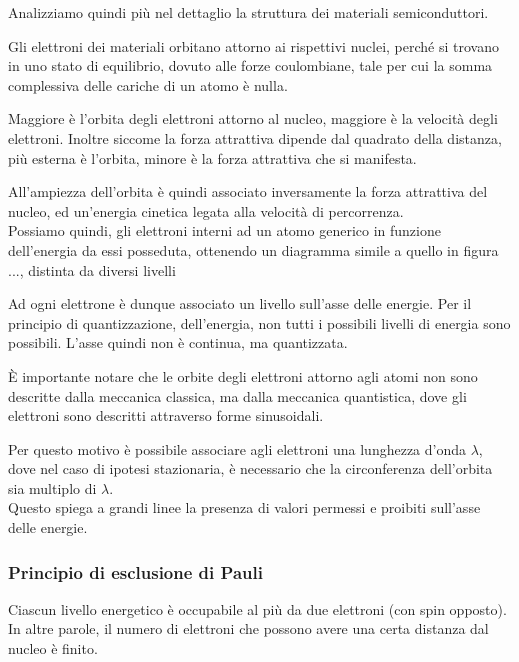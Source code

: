 \documentclass[../template]{subfiles}
\begin{document}
Analizziamo quindi più nel dettaglio la struttura dei materiali semiconduttori.

Gli elettroni dei materiali orbitano attorno ai rispettivi nuclei, perché si trovano in uno stato di equilibrio, dovuto alle forze coulombiane, tale per cui la somma complessiva delle cariche di un atomo è nulla.

Maggiore è l'orbita degli elettroni attorno al nucleo, maggiore è la velocità degli elettroni. Inoltre siccome la forza attrattiva dipende dal quadrato della distanza, più esterna è l'orbita, minore è la forza attrattiva che si manifesta.

All'ampiezza dell'orbita è quindi associato inversamente la forza attrattiva del nucleo, ed un'energia cinetica legata alla velocità di percorrenza.
\\
Possiamo quindi, gli elettroni interni ad un atomo generico in funzione dell'energia da essi posseduta, ottenendo un diagramma simile a quello in figura ..., distinta da diversi livelli

\begin{figure}[h]
    \centering
\end{figure}

Ad ogni elettrone è dunque associato un livello sull'asse delle energie.
Per il principio di quantizzazione, dell'energia, non tutti i possibili livelli di energia sono possibili. L'asse quindi non è continua, ma quantizzata.

È importante notare che le orbite degli elettroni attorno agli atomi non sono descritte dalla meccanica classica, ma dalla meccanica quantistica, dove gli elettroni sono descritti attraverso forme sinusoidali.

Per questo motivo è possibile associare agli elettroni una lunghezza d'onda $\lambda$, dove nel caso di ipotesi stazionaria, è necessario che la circonferenza dell'orbita sia multiplo di $\lambda$.
\\
Questo spiega a grandi linee la presenza di valori permessi e proibiti sull'asse delle energie.

\subsubsection{Principio di esclusione di Pauli}
Ciascun livello energetico è occupabile al più da due elettroni (con spin opposto). In altre parole, il numero di elettroni che possono avere una certa distanza dal nucleo è finito.
\end{document}
